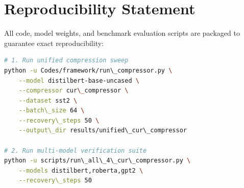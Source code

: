 \section{Reproducibility Statement}
All code, model weights, and benchmark evaluation scripts are packaged to guarantee exact reproducibility:
\begin{lstlisting}[language=bash]
# 1. Run unified compression sweep
python -u Codes/framework/run\_compressor.py \
    --model distilbert-base-uncased \
    --compressor cur\_compressor \
    --dataset sst2 \
    --batch\_size 64 \
    --recovery\_steps 50 \
    --output\_dir results/unified\_cur\_compressor

# 2. Run multi-model verification suite
python -u scripts/run\_all\_4\_cur\_compressor.py \
    --models distilbert,roberta,gpt2 \
    --recovery\_steps 50
\end{lstlisting}
